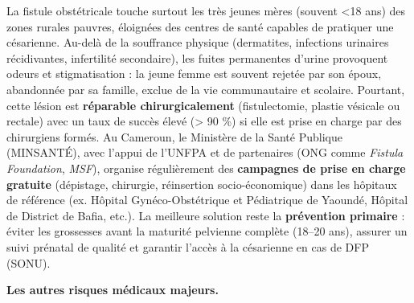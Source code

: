 \documentclass[11pt]{article}
\begin{document}
\begin{savaistu}
La fistule obstétricale touche surtout les très jeunes mères (souvent \textless 18 ans) des zones rurales pauvres, éloignées des centres de santé capables de pratiquer une césarienne. Au-delà de la souffrance physique (dermatites, infections urinaires récidivantes, infertilité secondaire), les fuites permanentes d'urine provoquent odeurs et stigmatisation : la jeune femme est souvent rejetée par son époux, abandonnée par sa famille, exclue de la vie communautaire et scolaire. Pourtant, cette lésion est \textbf{réparable chirurgicalement} (fistulectomie, plastie vésicale ou rectale) avec un taux de succès élevé (> 90 \%) si elle est prise en charge par des chirurgiens formés. Au Cameroun, le Ministère de la Santé Publique (MINSANTÉ), avec l'appui de l'UNFPA et de partenaires (ONG comme \emph{Fistula Foundation}, \emph{MSF}), organise régulièrement des \textbf{campagnes de prise en charge gratuite} (dépistage, chirurgie, réinsertion socio-économique) dans les hôpitaux de référence (ex. Hôpital Gynéco-Obstétrique et Pédiatrique de Yaoundé, Hôpital de District de Bafia, etc.). La meilleure solution reste la \textbf{prévention primaire} : éviter les grossesses avant la maturité pelvienne complète (18--20 ans), assurer un suivi prénatal de qualité et garantir l'accès à la césarienne en cas de DFP (SONU).
\end{savaistu}

\textbf{Les autres risques médicaux majeurs.}\par
\end{document}
